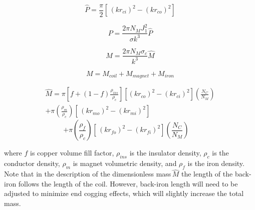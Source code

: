         
        \begin{equation}
            \hat P = \frac{\pi }{2}\left[ {\,{{\left( {k{r_{ci}}} \right)}^2} - {{\left( {k{r_{co}}} \right)}^2}} \right]
            \label{eq:P dimless}
        \end{equation}
        
        
        \begin{equation}
            P = \frac{{2\pi {N_M}J_1^2}}{{\sigma {k^3}}}\hat P
            \label{eq:power via power dimless}
        \end{equation}
        
        
        \begin{equation}
            M = \frac{{2\pi {N_M}{\sigma _c}}}{{{k^3}}}\hat M
            \label{eq:mass of motor via mass dimless}
        \end{equation}
        
        
        \begin{equation}
            M = {M_{coil}} + {M_{magnet}} + {M_{iron}}
            \label{eq:sum of all mass}
        \end{equation}
        
        
        \begin{align*}
            \hat M = \pi \left[ {f + \left( {1 - f} \right)\frac{{{\rho _{ins}}}}{{{\rho _c}}}} \right]\left[ { {{\left( {k{r_{co}}} \right)}^2} - {{\left( {k{r_{ci}}} \right)}^2}} \right]\left( {\frac{{{N_C}}}{{{N_M}}}} \right)
            \\
            +  \pi \left( {\frac{{{\rho _m}}}{{{\rho _c}}}} \right)\left[ {\,{{\left( {k{r_{mo}}} \right)}^2} - {{\left( {k{r_{mi}}} \right)}^2}} \right]\qquad\qquad\qquad\quad
            \end{align*}
            \begin{equation}
            +  \pi \left( {\frac{{{\rho _f}}}{{{\rho _c}}}} \right)\left[ {\,{{\left( {k{r_{fo}}} \right)}^2} - {{\left( {k{r_{fi}}} \right)}^2}} \right]\left( {\frac{{{N_C}}}{{{N_M}}}} \right)\quad \,
            \label{eq:sum of all mass dimless}
        \end{equation}
        
        
        where $f$ is copper volume fill factor, $\rho_{ins}$ is the insulator density, $\rho_c$ is the conductor density, $\rho_m$ is magnet volumetric density, and $\rho_f$ is the iron density. Note that in the description of the dimensionless mass\,$\hat M$ the length of the back-iron follows the length of the coil. However, back-iron length will need to be adjusted to minimize end cogging effects, which will slightly increase the total mass. 
        
